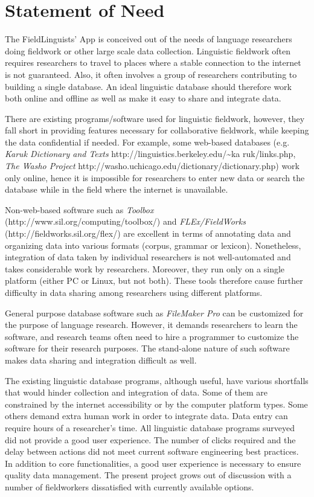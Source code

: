 \documentclass[12 pt]{article}
\begin{document}
\section {Statement of Need}

The FieldLinguists' App is conceived out of the needs of language researchers doing fieldwork or other large scale data collection. Linguistic fieldwork often requires researchers to travel to places where a stable connection to the internet is not guaranteed. Also, it often involves a group of researchers contributing to building a single database.
 An ideal linguistic database should therefore work both online and offline as well as make it easy to share and integrate data. 
 
There are existing programs/software used for linguistic fieldwork, 
however, they fall short in providing features necessary for collaborative fieldwork, while keeping the data confidential if needed. 
For example, some web-based databases (e.g.  {\it Karuk Dictionary and Texts} http://linguistics.berkeley.edu/{\textasciitilde}ka
ruk/links.php,   {\it The Washo Project} http://washo.uchicago.edu/dictionary/dictionary.php) work only online, hence it is impossible for researchers to enter new data or search the database while in the field where the internet is unavailable.  

Non-web-based software such as {\it Toolbox} (http://www.sil.org/computing/toolbox/) and {\it FLEx/FieldWorks} (http://fieldworks.sil.org/flex/)
are excellent in terms of annotating data and organizing data into various formats (corpus, grammar or lexicon). Nonetheless, integration of data taken by individual researchers is not well-automated and takes considerable work by researchers. Moreover, they run only on a single platform (either PC or Linux, but not both). These tools therefore cause further difficulty in data sharing among researchers using different platforms.  

General purpose database software such as {\it FileMaker Pro} can be customized for the purpose of language research. However, it demands researchers to learn the software, and research teams often need to hire a programmer to customize the software for their research purposes. The stand-alone nature of such software makes data sharing and integration difficult as well. 

The existing linguistic database programs, although useful, have various shortfalls that would hinder collection and integration of data. Some of them are constrained by the internet accessibility or by the computer platform types. Some others demand extra human work in order to integrate data. Data entry can require hours of a researcher's time. All linguistic database programs surveyed did not provide a good user experience. The number of clicks required and the delay between actions did not meet current software engineering best practices. In addition to core functionalities, a good user experience is necessary to ensure quality data management.
The present project grows out of discussion with a number of fieldworkers dissatisfied with currently available options. 
\end{document}
